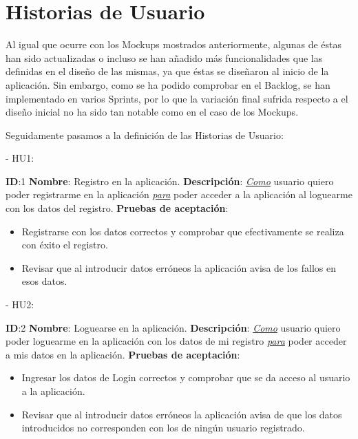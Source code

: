 \documentclass[11pt,openany]{book}
\begin{document}
\section{Historias de Usuario}

Al igual que ocurre con los Mockups mostrados anteriormente, algunas de éstas han sido actualizadas o incluso se han añadido más funcionalidades que las definidas en el diseño de las mismas, ya que éstas se diseñaron al inicio de la aplicación. Sin embargo, como se ha podido comprobar en el Backlog, se han implementado en varios Sprints, por lo que la variación final sufrida respecto a el diseño inicial no ha sido tan notable como en el caso de los Mockups.

Seguidamente pasamos a la definición de las Historias de Usuario:

- HU1:
 
\textbf{ID}:1 \textbf{Nombre}: Registro en la aplicación.\linebreak
\textbf{Descripción}: \textit{\underline{Como}} usuario quiero poder registrarme en la aplicación \textit{\underline{para}} poder acceder a la aplicación al loguearme con los datos del registro.\linebreak
\textbf{Pruebas de aceptación}:
\begin{itemize}
\item Registrarse con los datos correctos y comprobar que efectivamente se realiza con éxito el registro.
\item Revisar que al introducir datos erróneos la aplicación avisa de los fallos en esos datos.
\end{itemize}
 
- HU2:
 
\textbf{ID}:2 \textbf{Nombre}: Loguearse en la aplicación.\linebreak
\textbf{Descripción}: \textit{\underline{Como}} usuario quiero poder loguearme en la aplicación con los datos de mi registro \textit{\underline{para}} poder acceder a mis datos en la aplicación.\linebreak
\textbf{Pruebas de aceptación}:
\begin{itemize}
\item Ingresar los datos de Login correctos y comprobar que se da acceso al usuario a la aplicación.
\item Revisar que al introducir datos erróneos la aplicación avisa de que los datos introducidos no corresponden con los de ningún usuario registrado.
\end{itemize}
 
\end{document}
